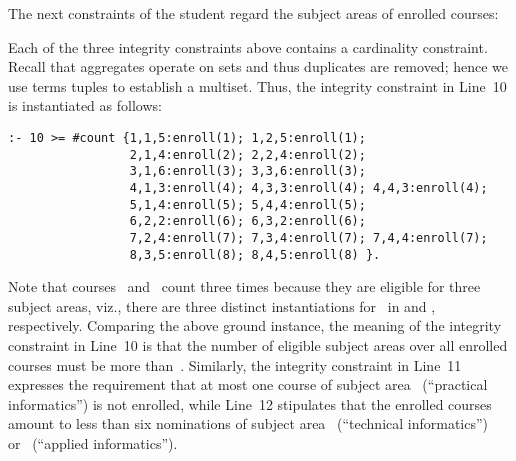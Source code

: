 \begin{example}
The next constraints of the student regard the subject areas of enrolled courses:
%

%
Each of the three integrity constraints above contains a cardinality constraint.
Recall that aggregates operate on sets and thus duplicates are removed;
hence we use terms tuples to establish a multiset.
Thus, the integrity constraint in Line~10 is instantiated as follows:
%
\begin{lstlisting}[firstnumber=10,stepnumber=10]
:- 10 >= #count {1,1,5:enroll(1); 1,2,5:enroll(1); 
                 2,1,4:enroll(2); 2,2,4:enroll(2); 
                 3,1,6:enroll(3); 3,3,6:enroll(3); 
                 4,1,3:enroll(4); 4,3,3:enroll(4); 4,4,3:enroll(4); 
                 5,1,4:enroll(5); 5,4,4:enroll(5); 
                 6,2,2:enroll(6); 6,3,2:enroll(6); 
                 7,2,4:enroll(7); 7,3,4:enroll(7); 7,4,4:enroll(7); 
                 8,3,5:enroll(8); 8,4,5:enroll(8) }. 
\end{lstlisting}
%
Note that courses~ and~ count three times because
they are eligible for three subject areas, viz., there are three
distinct instantiations for~ in
 and
, respectively.
Comparing the above ground instance,
the meaning of the integrity constraint in Line~10 is that the 
number of eligible subject areas over all enrolled courses
must be more than~.
Similarly, the integrity constraint in Line~11 expresses the requirement
that at most one course of subject area~ (``practical informatics'')
is not enrolled,
while Line~12 stipulates that the enrolled courses
amount to less than six nominations of
subject area~ (``technical informatics'') 
or~ (``applied informatics'').


\end{example}
